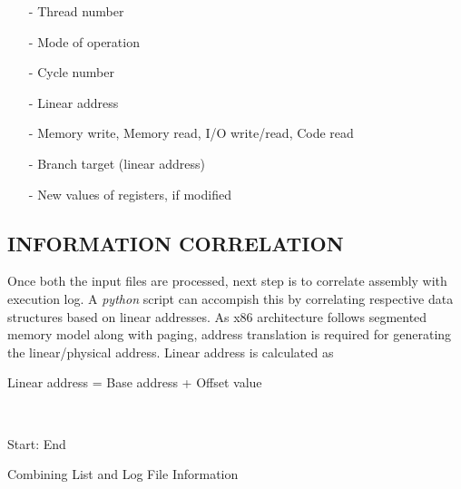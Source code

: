 
\begin{itemize}
 \item[-]  Thread number
 \item[-]  Mode of operation
 \item[-]  Cycle number
 \item[-]  Linear address
 \item[-]  Memory write, Memory read, I/O write/read, Code read
 \item[-]  Branch target (linear address)
 \item[-]  New values of registers, if modified
\end{itemize}


\subsection {INFORMATION CORRELATION}

Once both the input files are processed, next step is to correlate assembly with execution log. A {\it python} script can accompish this by correlating respective data structures based on linear addresses. As x86 architecture follows segmented memory model along with paging, address translation is required for generating the linear/physical address\cite{SS:AMD64-V2}. Linear address is calculated as
\\
\centerline{Linear address = Base address + Offset value}
\\



\IncMargin{1em}
\begin{algorithm}[h]
\DontPrintSemicolon
{} 

\BlankLine
Start: \;
End \;
\caption{Combining List and Log File Information}
\label{algo:impl:cllf}
\end{algorithm}\DecMargin{1em}

